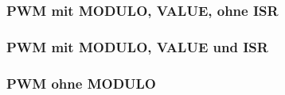 \newpage
\subsubsection{PWM mit MODULO, VALUE, ohne ISR}


\newpage
\subsubsection{PWM mit MODULO, VALUE und ISR}


\newpage
\subsubsection{PWM ohne MODULO}

